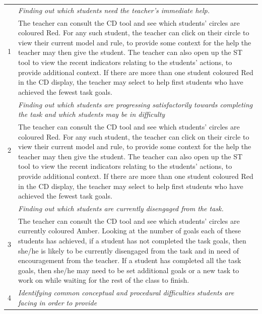 \begin{table}[htbp]
  \begin{tabular}{|p{0.5cm}|p{12.5cm}|}
  \hline \multirow{2}{*}{1} & \emph{Finding out which students need
    the teacher’s
    immediate help.} \\
  \cline{2-2} & The teacher can consult the CD tool and see which
  students’ circles are coloured Red. For any such student, the
  teacher can click on their circle to view their current model and
  rule, to provide some context for the help the teacher may then give
  the student. The teacher can also open up the ST tool to view the
  recent indicators relating to the students’ actions, to provide
  additional context. If there are more than one student coloured Red
  in the CD display, the teacher may select to help first students who
  have achieved the fewest
  task goals. \\
  \hline \multirow{2}{*}{2} & \emph{Finding out which students are
    progressing satisfactorily towards completing the task and which
    students may be in
    difficulty} \\
  \cline{2-2} 
  & The teacher can consult the CD tool and see which
  students’ circles are coloured Red. For any such student, the
  teacher can click on their circle to view their current model and
  rule, to provide some context for the help the teacher may then give
  the student. The teacher can also open up the ST tool to view the
  recent indicators relating to the students’ actions, to provide
  additional context. If there are more than one student coloured Red
  in the CD display, the teacher may select to help first students who
  have achieved the fewest
  task goals. \\
  \hline \multirow{2}{*}{3} & \emph{Finding out which students are
    currently disengaged from the task.} \\
  \cline{2-2} 
  & The teacher can consult the CD tool and see which students’
  circles are currently coloured Amber. Looking at the number of goals
  each of these students has achieved, if a student has not completed
  the task goals, then she/he is likely to be currently disengaged
  from the task and in need of encouragement from the teacher. If a
  student has completed all the task goals, then she/he may need to be
  set additional goals or a new task to work on while waiting for the
  rest of the class to finish. \\
  \hline \multirow{2}{*}{4} & \emph{Identifying common conceptual and
    procedural difficulties students are facing in order to provide
}
\end{tabular}
\end{table}
